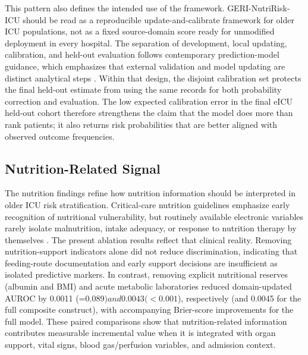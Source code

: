 \documentclass[utf8]{FrontiersinVancouver}
\begin{document}
This pattern also defines the intended use of the framework. GERI-NutriRisk-ICU should be read as a reproducible update-and-calibrate framework for older ICU populations, not as a fixed source-domain score ready for unmodified deployment in every hospital. The separation of development, local updating, calibration, and held-out evaluation follows contemporary prediction-model guidance, which emphasizes that external validation and model updating are distinct analytical steps \citep{Collins2024EvalPart1,Riley2024EvalPart2,Collins2024TRIPODAI}. Within that design, the disjoint calibration set protects the final held-out estimate from using the same records for both probability correction and evaluation. The low expected calibration error in the final eICU held-out cohort therefore strengthens the claim that the model does more than rank patients; it also returns risk probabilities that are better aligned with observed outcome frequencies.

\subsection{Nutrition-Related Signal}
The nutrition findings refine how nutrition information should be interpreted in older ICU risk stratification. Critical-care nutrition guidelines emphasize early recognition of nutritional vulnerability, but routinely available electronic variables rarely isolate malnutrition, intake adequacy, or response to nutrition therapy by themselves \citep{Singer2023ESPENPractical,Compher2022ASPEN,Compher2025GLIMCriticalIllness}. The present ablation results reflect that clinical reality. Removing nutrition-support indicators alone did not reduce discrimination, indicating that feeding-route documentation and early support decisions are insufficient as isolated predictive markers. In contrast, removing explicit nutritional reserves (albumin and BMI) and acute metabolic laboratories reduced domain-updated AUROC by 0.0011 (=0.089$) and 0.0043 (<0.001$), respectively (and 0.0045 for the full composite construct), with accompanying Brier-score improvements for the full model. These paired comparisons show that nutrition-related information contributes measurable incremental value when it is integrated with organ support, vital signs, blood gas/perfusion variables, and admission context.
\end{document}
